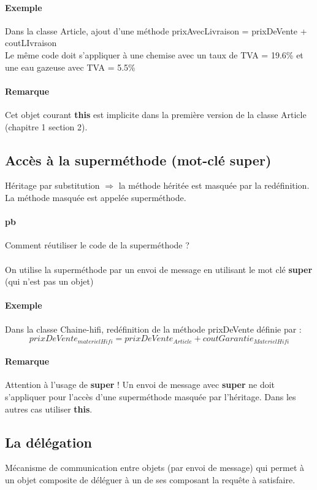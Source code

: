 \paragraph{Exemple}Dans la classe Article, ajout d'une méthode prixAvecLivraison = prixDeVente + coutLIvraison\\
Le même code doit s'appliquer à une chemise avec un taux de TVA = 19.6\% et une eau gazeuse avec TVA = 5.5\%

\paragraph{Remarque}
Cet objet courant \textbf{this} est implicite dans la première version de la classe Article
(chapitre 1 section 2).

\subsection{Accès à la superméthode (mot-clé \textbf{super})}
Héritage par substitution $\Rightarrow$ la méthode héritée est masquée par la redéfinition. \\
La méthode masquée est appelée superméthode.

\paragraph{pb} Comment réutiliser le code de la superméthode ? 
\paragraph{} On utilise la superméthode par un envoi de message en utilisant le mot clé \textbf{super}
(qui n'est pas un objet)
\paragraph{Exemple} Dans la classe Chaine-hifi, redéfinition de la méthode prixDeVente définie par :
$$prixDeVente_{materielHifi} = prixDeVente_{Article} + coutGarantie_{MaterielHifi}$$

\paragraph{Remarque} Attention à l'usage de \textbf{super} ! Un envoi de message avec \textbf{super}
ne doit s'appliquer pour l'accès d'une superméthode masquée par l'héritage. Dans les autres cas utiliser
\textbf{this}.

\subsection{La délégation}
Mécanisme de communication entre objets (par envoi de message) qui permet à un objet composite
de déléguer à un de ses composant la requête à satisfaire.
